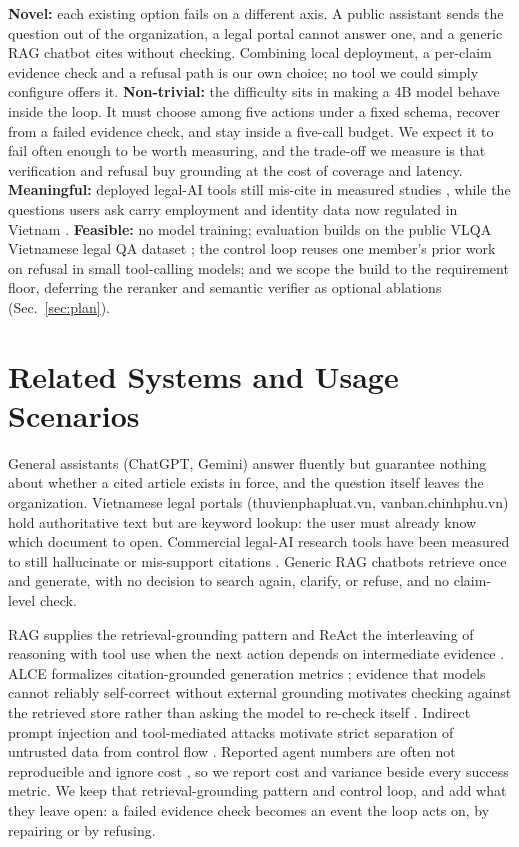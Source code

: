 \textbf{Novel:} each existing option fails on a different axis. A public assistant sends the question out of the organization, a legal portal cannot answer one, and a generic RAG chatbot cites without checking. Combining local deployment, a per-claim evidence check and a refusal path is our own choice; no tool we could simply configure offers it.
\textbf{Non-trivial:} the difficulty sits in making a 4B model behave inside the loop. It must choose among five actions under a fixed schema, recover from a failed evidence check, and stay inside a five-call budget. We expect it to fail often enough to be worth measuring, and the trade-off we measure is that verification and refusal buy grounding at the cost of coverage and latency.
\textbf{Meaningful:} deployed legal-AI tools still mis-cite in measured studies \citep{magesh2025hallucination}, while the questions users ask carry employment and identity data now regulated in Vietnam \citep{vietnam2025pdpl,decree3562025}.
\textbf{Feasible:} no model training; evaluation builds on the public VLQA Vietnamese legal QA dataset \citep{vlqa2025}; the control loop reuses one member's prior work on refusal in small tool-calling models; and we scope the build to the requirement floor, deferring the reranker and semantic verifier as optional ablations (Sec.~\ref{sec:plan}).

\section{Related Systems and Usage Scenarios}

General assistants (ChatGPT, Gemini) answer fluently but guarantee nothing about whether a cited article exists in force, and the question itself leaves the organization. Vietnamese legal portals (thuvienphapluat.vn, vanban.chinhphu.vn) hold authoritative text but are keyword lookup: the user must already know which document to open. Commercial legal-AI research tools have been measured to still hallucinate or mis-support citations \citep{magesh2025hallucination}. Generic RAG chatbots retrieve once and generate, with no decision to search again, clarify, or refuse, and no claim-level check.

RAG supplies the retrieval-grounding pattern \citep{lewis2020rag} and ReAct the interleaving of reasoning with tool use when the next action depends on intermediate evidence \citep{yao2023react}. ALCE formalizes citation-grounded generation metrics \citep{gao2023alce}; evidence that models cannot reliably self-correct without external grounding motivates checking against the retrieved store rather than asking the model to re-check itself \citep{huang2024selfcorrect}. Indirect prompt injection and tool-mediated attacks motivate strict separation of untrusted data from control flow \citep{greshake2023indirect,debenedetti2024agentdojo}. Reported agent numbers are often not reproducible and ignore cost \citep{kapoor2025agentsmatter}, so we report cost and variance beside every success metric. We keep that retrieval-grounding pattern and control loop, and add what they leave open: a failed evidence check becomes an event the loop acts on, by repairing or by refusing.

